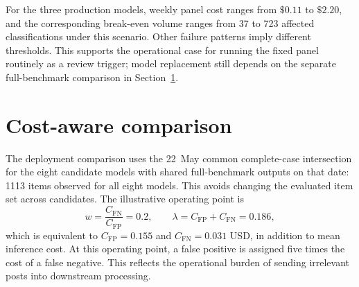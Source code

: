 \begin{table}[htbp]
    \centering
    \small
    \caption[Production-model monitoring scenarios]{Model-specific monitoring costs and break-even volumes under the observed episode's incremental error loss of \(\$0.003037\) per affected classification. Costs are USD; annual panel cost is \(52\times\) weekly panel cost, and weekly break-even volume is \(\text{panel cost}/0.003037=\text{annual panel cost}/(52\times0.003037)\).}
    \label{tab:production-monitoring-scenarios}
    
\end{table}

For the three production models, weekly panel cost ranges from \(\$0.11\) to \(\$2.20\), and the corresponding break-even volume ranges from 37 to 723 affected classifications under this scenario. Other failure patterns imply different thresholds. This supports the operational case for running the fixed panel routinely as a review trigger; model replacement still depends on the separate full-benchmark comparison in Section~\ref{sec:cost-aware-comparison}.

\section{Cost-aware comparison}
\label{sec:cost-aware-comparison}

The deployment comparison uses the 22~May common complete-case intersection for the eight candidate models with shared full-benchmark outputs on that date: 1113 items observed for all eight models. This avoids changing the evaluated item set across candidates. The illustrative operating point is
\[
    w=\frac{C_{\mathrm{FN}}}{C_{\mathrm{FP}}}=0.2,
    \qquad
    \lambda=C_{\mathrm{FP}}+C_{\mathrm{FN}}=0.186,
\]
which is equivalent to \(C_{\mathrm{FP}}=0.155\) and \(C_{\mathrm{FN}}=0.031\) USD, in addition to mean inference cost. At this operating point, a false positive is assigned five times the cost of a false negative. This reflects the operational burden of sending irrelevant posts into downstream processing.

\begin{table}[htbp]
    \centering
    \small
    \caption{Complete-case results on 22~May 2026 (\(n_t=1113\)); \(w=0.2\), \(\lambda=0.186\).}
    \label{tab:canonical-cost-comparison}
    
\end{table}

